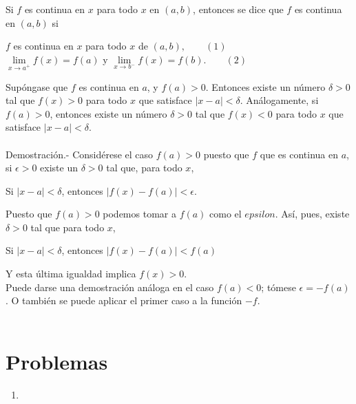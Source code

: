 \begin{tcolorbox}[colframe = white]
    \begin{def.} Si $f$ es continua en $x$ para todo $x$ en $(a,b)$, entonces se dice que $f$ es continua en $(a,b)$ si 
	\begin{center}
	    $f$ es continua en $x$ para todo $x$ de $(a,b), \qquad (1)$\\
	    \vspace{.5cm}
	    $\lim\limits_{x\to a^+} f(x) = f(a)$ y $\lim\limits_{x\to b^-}f(x) = f(b). \qquad (2)$
	\end{center}
    \end{def.}
\end{tcolorbox}

\begin{teo} Supóngase que $f$ es continua en $a$, y $f(a)>0$. Entonces existe un número $\delta>0$ tal que $f(x)>0$ para todo $x$ que satisface $|x-a|<\delta$. Análogamente, si $f(a)>0$, entonces existe un número $\delta>0$ tal que $f(x)<0$ para todo $x$ que satisface $|x-a|<\delta.$\\\\
    Demostración.-\; Considérese el caso $f(a)>0$ puesto que $f$ que es continua en $a$, si $\epsilon>0$ existe un $\delta>0$ tal que, para todo $x$,
    \begin{center}
	Si $|x-a|<\delta$, entonces $|f(x)-f(a)|<\epsilon.$
    \end{center}
    Puesto que $f(a)>0$ podemos tomar a $f(a)$ como el $epsilon$. Así, pues, existe $\delta>0$ tal que para todo $x$,
    \begin{center}
	Si $|x-a|<\delta$, entonces $|f(x)-f(a)|<f(a)$
    \end{center}
    Y esta última igualdad implica $f(x)>0$.\\
    Puede darse una demostración análoga en el caso $f(a)<0$; tómese $\epsilon=-f(a)$. O también se puede aplicar el primer caso a la función $-f$.\\\\

\end{teo}

\section{Problemas}
\begin{enumerate}

\item 

\end{enumerate}

